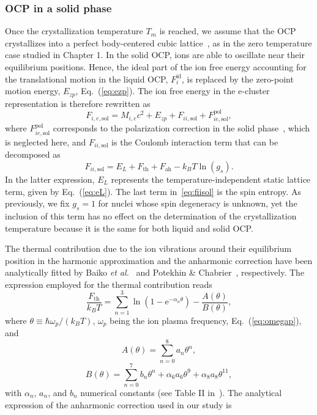 \subsubsection{OCP in a solid phase}

Once the crystallization temperature $T_m$ is reached, we assume that the OCP 
crystallizes into a perfect body-centered cubic lattice~\cite{Chamel2016}, as
in the zero temperature case studied in Chapter 1. In the solid OCP, ions are
able to oscillate near their equilibrium positions. Hence, the ideal 
part of the ion free energy accounting for the translational motion in the 
liquid OCP, $F_{i}^{\text{id}}$, is replaced by the zero-point motion energy, 
$E_{zp}$, Eq.~(\ref{eq:ezp}). The ion free energy in the e-cluster
representation is therefore rewritten as
%
\begin{equation}
  F_{i,e,\text{sol}} = M_{i,e}c^2 + E_{zp} + F_{ii,\text{sol}} +
  F_{ie,\text{sol}}^{\text{pol}},
\end{equation}
%
where $F_{ie,\text{sol}}^{\text{pol}}$ corresponds to the polarization
correction in the solid phase~\cite{Potekhin2000}, which is neglected here, and
$F_{ii,\text{sol}}$ is the Coulomb interaction term that can be decomposed as
%
\begin{equation}
  F_{ii,\text{sol}} = E_L + F_{\text{th}} + F_{\text{ah}} - k_B
  T\ln(g_s).\label{eq:fiisol}
\end{equation}
%
In the latter expression, $E_L$ represents the temperature-independent static 
lattice term, given by Eq.~(\ref{eq:eL}). The last term in~\ref{eq:fiisol} is
the spin entropy. As previously, we fix $g_s=1$ for nuclei whose spin 
degeneracy is unknown, yet the inclusion of this term has no effect on the 
determination of the crystallization temperature because it is the same for 
both liquid and solid OCP.

The thermal contribution due to the ion vibrations around their equilibrium 
position in the harmonic approximation and the anharmonic correction have been 
analytically fitted by Baiko \textit{et al.}~\cite{Baiko2001} and Potekhin \&
Chabrier~\cite{Potekhin2010}, respectively. 
The expression employed for the thermal contribution reads~\cite{Baiko2001}
%
\begin{equation}
  \frac{F_{\text{th}}}{k_B T} = \sum_{n=1}^3\ln\left(1
    -\text{e}^{-\alpha_n\theta}\right) 
  - \frac{A(\theta)}{B(\theta)},
\end{equation}
%
where $\theta \equiv \hbar\omega_p/(k_B T)$, $\omega_p$ being the ion plasma
frequency, Eq.~(\ref{eq:omegap}), and
%
\begin{equation}
  A(\theta) = \sum_{n=0}^{8}a_n\theta^n,
\end{equation}
%
\begin{equation}
  B(\theta) = \sum_{n=0}^{7}b_n\theta^n 
  + \alpha_6 a_6 \theta^9 
  + \alpha_8 a_8 \theta^{11},
\end{equation}
%
with $\alpha_n$, $a_n$, and $b_n$ numerical constants (see Table II
in~\cite{Baiko2001}).
The analytical expression of the anharmonic correction used in our study
is~\cite{Potekhin2010}

